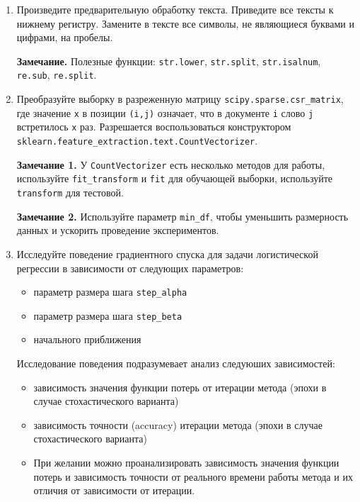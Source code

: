 \documentclass[10pt,fleqn]{article}
\begin{document}
\begin{enumerate}
    \item Произведите предварительную обработку текста. Приведите все тексты к нижнему регистру. Замените в тексте все символы, не являющиеся буквами и цифрами, на пробелы.

    \textbf{Замечание.}
    Полезные функции: \verb|str.lower|,  \verb|str.split|, \verb|str.isalnum|, \verb|re.sub|, \verb|re.split|.

    \item Преобразуйте выборку в разреженную матрицу \verb|scipy.sparse.csr_matrix|, где значение \verb|x| в позиции \verb|(i,j)| означает, что в документе \verb|i| слово \verb|j| встретилось \verb|x| раз.
    Разрешается воспользоваться конструктором  \verb|sklearn.feature_extraction.text.CountVectorizer|.

    \textbf{Замечание 1.} У \verb|CountVectorizer| есть несколько методов для работы, используйте \texttt{fit\_transform} и \texttt{fit} для обучающей выборки, используйте \texttt{transform} для тестовой.

    \textbf{Замечание 2.} Используйте параметр \texttt{min\_df}, чтобы уменьшить размерность данных и ускорить проведение экспериментов.

    \item Исследуйте поведение градиентного спуска для задачи логистической регрессии в зависимости от следующих параметров:
    \begin{itemize}
        \item параметр размера шага \texttt{step\_alpha}
        \item параметр размера шага \texttt{step\_beta}
        \item начального приближения
    \end{itemize}

    Исследование поведения подразумевает анализ следуюших зависимостей:
    \begin{itemize}
        \item зависимость значения функции потерь от итерации метода (эпохи в случае стохастического варианта)

        \item зависимость точности (accuracy) итерации метода (эпохи в случае стохастического варианта)
        
        \item При желании можно проанализировать зависимость значения функции потерь и зависимость точности от реального времени работы метода и их отличия от зависимости от итерации.
    \end{itemize}


\end{enumerate}
\end{document}

